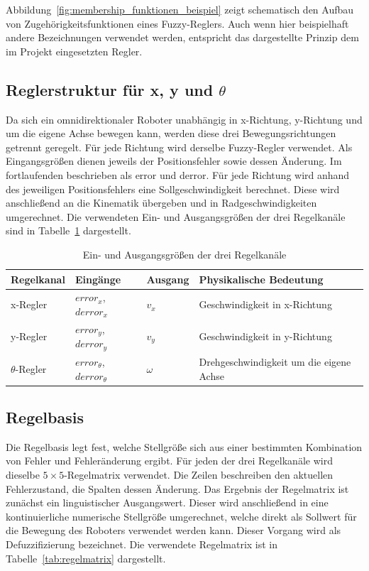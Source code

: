Abbildung~\ref{fig:membership_funktionen_beispiel} zeigt schematisch den Aufbau von Zugehörigkeitsfunktionen eines Fuzzy-Reglers. Auch wenn hier beispielhaft andere Bezeichnungen verwendet werden, entspricht das dargestellte Prinzip dem im Projekt eingesetzten Regler.

\subsection{Reglerstruktur für x, y und $\theta$}

Da sich ein omnidirektionaler Roboter unabhängig in x-Richtung, y-Richtung und um die eigene Achse bewegen kann, werden diese drei Bewegungsrichtungen getrennt geregelt. Für jede Richtung wird derselbe Fuzzy-Regler verwendet. Als Eingangsgrößen dienen jeweils der Positionsfehler sowie dessen Änderung. Im fortlaufenden beschrieben als error und derror. Für jede Richtung wird anhand des jeweiligen Positionsfehlers eine Sollgeschwindigkeit berechnet. Diese wird anschließend an die Kinematik übergeben und in Radgeschwindigkeiten umgerechnet. Die verwendeten Ein- und Ausgangsgrößen der drei Regelkanäle sind in Tabelle~\ref{tab:regelkanaele} dargestellt. \cite{Nguyen2022}

\begin{table}[H]
    \centering
    \caption{Ein- und Ausgangsgrößen der drei Regelkanäle}
    \label{tab:regelkanaele}
    \begin{tabular}{llll}
        \toprule
        Regelkanal & Eingänge & Ausgang & Physikalische Bedeutung \\
        \midrule
        x-Regler &
        $error_x$, $derror_x$ &
        $v_x$ &
        Geschwindigkeit in x-Richtung \\

        y-Regler &
        $error_y$, $derror_y$ &
        $v_y$ &
        Geschwindigkeit in y-Richtung \\

        $\theta$-Regler &
        $error_\theta$, $derror_\theta$ &
        $\omega$ &
        Drehgeschwindigkeit um die eigene Achse \\
        \bottomrule
    \end{tabular}
\end{table}

\subsection{Regelbasis}

Die Regelbasis legt fest, welche Stellgröße sich aus einer bestimmten Kombination von Fehler und Fehleränderung ergibt. Für jeden der drei Regelkanäle wird dieselbe $5 \times 5$-Regelmatrix verwendet. Die Zeilen beschreiben den aktuellen Fehlerzustand, die Spalten dessen Änderung. Das Ergebnis der Regelmatrix ist zunächst ein linguistischer Ausgangswert. Dieser wird anschließend in eine kontinuierliche numerische Stellgröße umgerechnet, welche direkt als Sollwert für die Bewegung des Roboters verwendet werden kann. Dieser Vorgang wird als Defuzzifizierung bezeichnet. Die verwendete Regelmatrix ist in Tabelle~\ref{tab:regelmatrix} dargestellt. \cite{Nguyen2022}

